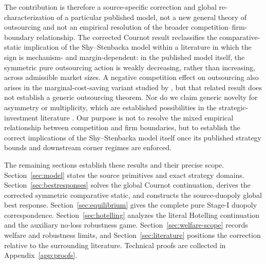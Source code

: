 The contribution is therefore a source-specific correction and global re-characterization of a particular published model, not a new general theory of outsourcing and not an empirical resolution of the broader competition--firm-boundary relationship.  The corrected Cournot result reclassifies the comparative-static implication of the Shy--Stenbacka model within a literature in which the sign is mechanism- and margin-dependent: in the published model itself, the symmetric pure outsourcing action is weakly decreasing, rather than increasing, across admissible market sizes.  A negative competition effect on outsourcing also arises in the marginal-cost-saving variant studied by \cite{Konig2010}, but that related result does not establish a generic outsourcing theorem.  Nor do we claim generic novelty for asymmetry or multiplicity, which are established possibilities in the strategic-investment literature \cite{Amir2000,AmirGarciaKnauff2010,AmirHalmenschlagerJin2011,EckertKlumppSu2017}.  Our purpose is not to resolve the mixed empirical relationship between competition and firm boundaries, but to establish the correct implications of the Shy--Stenbacka model itself once its published strategy bounds and downstream corner regimes are enforced.

The remaining sections establish these results and their precise scope.  Section~\ref{sec:model} states the source primitives and exact strategy domains.  Section~\ref{sec:bestresponses} solves the global Cournot continuation, derives the corrected symmetric comparative static, and constructs the source-duopoly global best response.  Section~\ref{sec:equilibrium} gives the complete pure Stage-I duopoly correspondence.  Section~\ref{sec:hotelling} analyzes the literal Hotelling continuation and the auxiliary no-loss robustness game.  Section~\ref{sec:welfare-scope} records welfare and robustness limits, and Section~\ref{sec:literature} positions the correction relative to the surrounding literature.  Technical proofs are collected in Appendix~\ref{app:proofs}.
